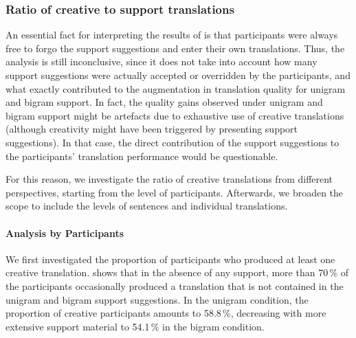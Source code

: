 \documentclass[output=paper]{LSP/langsci}
\begin{document}
\subsubsection{Ratio of creative to support translations}
\label{sec:kremer:creative-support-ratio}

An essential fact for interpreting the results of
 is that participants
were always free to forgo the support suggestions and enter their own
translations. Thus, the analysis is still inconclusive, since it does
not take into account how many support suggestions were actually
accepted or overridden by the participants, and what exactly
contributed to the augmentation in translation quality for unigram and
bigram support. In fact, the quality gains observed under unigram and
bigram support might be artefacts due to exhaustive use of creative
translations (although creativity might have been triggered by
presenting support suggestions). In that case, the direct contribution
of the support suggestions to the participants' translation
performance would be questionable.

For this reason, we investigate the ratio of creative translations
from different perspectives, starting from the level of
participants. Afterwards, we broaden the scope to include the levels
of sentences and individual translations.


\paragraph{Analysis by Participants}

We first investigated the proportion of participants who produced at
least one creative translation. 
shows that in the absence of any support, more than 70\,\% of the
participants occasionally produced a translation that is not contained
in the unigram and bigram support suggestions. In the unigram condition,
the proportion of creative participants amounts to 58.8\,\%, decreasing 
with more extensive support material to 54.1\,\% in the bigram condition.


\end{document}
